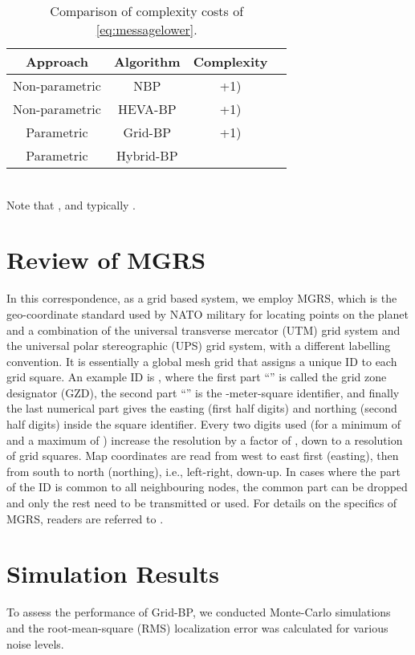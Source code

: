 \documentclass[10pt, final, journal]{IEEEtran}
\begin{document}
\begin{table}[H]
\caption{Comparison of complexity costs of \eqref{eq:messagelower}.}
\center
\label{table:productcomplexity}

\begin{tabular}{c|c|c|c}
Approach & Algorithm & Complexity\\
\hline
Non-parametric & NBP  & +1)\\
Non-parametric & HEVA-BP  & +1)\\
Parametric & Grid-BP  & +1)\\
Parametric & Hybrid-BP  & \\
\end{tabular}\\
Note that , and typically .
\end{table}

\section{Review of MGRS}\label{militarygridreferencesystem}
In this correspondence, as a grid based system, we employ MGRS, which is the geo-coordinate standard used by NATO military for locating points on the planet \cite{ngamgrs} and a combination of the universal transverse mercator (UTM) grid system and the universal polar stereographic (UPS) grid system, with a different labelling convention. It is essentially a global mesh grid that assigns a unique ID to each grid square. An example ID is , where the first part ``'' is called the grid zone designator (GZD), the second part ``'' is the -meter-square identifier, and finally the last numerical part gives the easting (first half digits) and northing (second half digits) inside the square identifier. Every two digits used (for a minimum of  and a maximum of ) increase the resolution by a factor of , down to a resolution of  grid squares. Map coordinates are read from west to east first (easting), then from south to north (northing), i.e., left-right, down-up. In cases where the part of the ID is common to all neighbouring nodes, the common part can be dropped and only the rest need to be transmitted or used. For details on the specifics of MGRS, readers are referred to \cite{ngamgrs}.

\section{Simulation Results}

To assess the performance of Grid-BP, we conducted  Monte-Carlo simulations and the root-mean-square (RMS) localization error was calculated for various noise levels.
\end{document}
